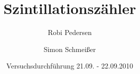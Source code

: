 \documentclass[a4paper,oneside]{scrartcl} %
\title{Szintillationszähler}
\author{Robi Pedersen \and Simon Schmeißer}
\date{Versuchsdurchführung 21.09. - 22.09.2010}
\begin{document}
\begin{titlepage}
  \maketitle
  \vfill
  \thispagestyle{empty}
\end{titlepage}

\tableofcontents
\clearpage



%




\clearpage

% 
%
\end{document}
